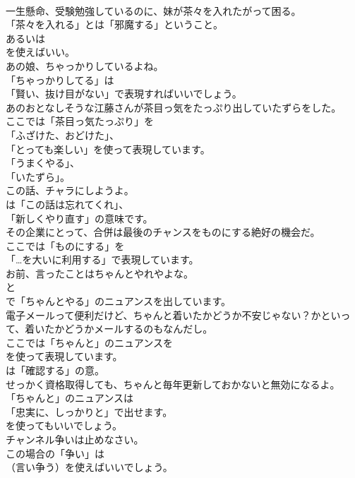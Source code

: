 \documentclass[8pt]{extreport}
\begin{document}
\begin{CJK}{UTF8}{min}
\\	一生懸命、受験勉強しているのに、妹が茶々を入れたがって困る。 
\\	「茶々を入れる」とは「邪魔する」ということ。
\\	あるいは
\\	を使えばいい。	
\\	あの娘、ちゃっかりしているよね。 
\\	「ちゃっかりしてる」は
\\	「賢い、抜け目がない」で表現すればいいでしょう。	
\\	あのおとなしそうな江藤さんが茶目っ気をたっぷり出していたずらをした。 
\\	ここでは「茶目っ気たっぷり」を
\\	「ふざけた、おどけた」、
\\	「とっても楽しい」を使って表現しています。
\\	「うまくやる」、
\\	「いたずら」。	
\\	この話、チャラにしようよ。 
\\	は「この話は忘れてくれ」、
\\	「新しくやり直す」の意味です。	
\\	その企業にとって、合併は最後のチャンスをものにする絶好の機会だ。 
\\	ここでは「ものにする」を
\\	「…を大いに利用する」で表現しています。	
\\	お前、言ったことはちゃんとやれやよな。 
\\	と
\\	で「ちゃんとやる」のニュアンスを出しています。	
\\	電子メールって便利だけど、ちゃんと着いたかどうか不安じゃない？かといって、着いたかどうかメールするのもなんだし。 
\\	ここでは「ちゃんと」のニュアンスを
\\	を使って表現しています。
\\	は「確認する」の意。	
\\	せっかく資格取得しても、ちゃんと毎年更新しておかないと無効になるよ。 
\\	「ちゃんと」のニュアンスは
\\	「忠実に、しっかりと」で出せます。
\\	を使ってもいいでしょう。	
\\	チャンネル争いは止めなさい。 
\\	この場合の「争い」は
\\	（言い争う）を使えばいいでしょう。	

\end{CJK}
\end{document}

